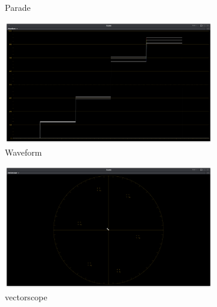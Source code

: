 \begin{figure}[ht!]
\begin{subfigure}[b]{0.475\textwidth}
            \caption[Parade]%
            {{\small Parade}}    
            \label{fig:parade-rec709_d60sim}
        \end{subfigure}
        \quad
        \begin{subfigure}[b]{0.475\textwidth}   
            \centering 
            \includegraphics[width=\textwidth]{images/rec709_d60sim/rec709_d60sim_waveform}
            \caption[]%
            {{\small Waveform}}    
            \label{fig:wf-rec709_d60sim}
        \end{subfigure}
        \begin{subfigure}[b]{0.475\textwidth}   
            \centering 
            \includegraphics[width=\textwidth]{images/rec709_d60sim/rec709_d60sim_vectorscope}
            \caption[]%
            {{\small vectorscope}}    
            \label{fig:vect-rec709_d60sim}
        \end{subfigure}
        \quad
        \begin{subfigure}[b]{0.475\textwidth}   
            \centering 

\end{subfigure}
\end{figure}
